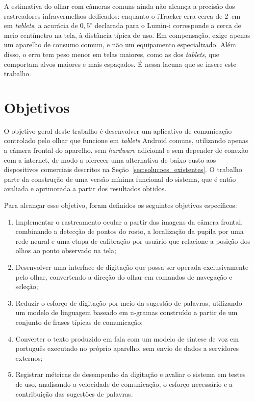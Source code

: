 A estimativa do olhar com câmeras comuns ainda não alcança a precisão dos rastreadores infravermelhos dedicados: enquanto o iTracker erra cerca de 2~cm em \textit{tablets}, a acurácia de $0{,}5^\circ$ declarada para o Lumin-i corresponde a cerca de meio centímetro na tela, à distância típica de uso. Em compensação, exige apenas um aparelho de consumo comum, e não um equipamento especializado. Além disso, o erro tem peso menor em telas maiores, como as dos \textit{tablets}, que comportam alvos maiores e mais espaçados. É nessa lacuna que se insere este trabalho.

\section{Objetivos} \label{sec:objetivos}

O objetivo geral deste trabalho é desenvolver um aplicativo de comunicação controlado pelo olhar que funcione em \textit{tablets} Android comuns, utilizando apenas a câmera frontal do aparelho, sem \textit{hardware} adicional e sem depender de conexão com a internet, de modo a oferecer uma alternativa de baixo custo aos dispositivos comerciais descritos na Seção~\ref{sec:solucoes_existentes}. O trabalho parte da construção de uma versão mínima funcional do sistema, que é então avaliada e aprimorada a partir dos resultados obtidos.

Para alcançar esse objetivo, foram definidos os seguintes objetivos específicos:

\begin{enumerate}
    \item Implementar o rastreamento ocular a partir das imagens da câmera frontal, combinando a detecção de pontos do rosto, a localização da pupila por uma rede neural e uma etapa de calibração por usuário que relacione a posição dos olhos ao ponto observado na tela;
    \item Desenvolver uma interface de digitação que possa ser operada exclusivamente pelo olhar, convertendo a direção do olhar em comandos de navegação e seleção;
    \item Reduzir o esforço de digitação por meio da sugestão de palavras, utilizando um modelo de linguagem baseado em n-gramas construído a partir de um conjunto de frases típicas de comunicação;
    \item Converter o texto produzido em fala com um modelo de síntese de voz em português executado no próprio aparelho, sem envio de dados a servidores externos;
    \item Registrar métricas de desempenho da digitação e avaliar o sistema em testes de uso, analisando a velocidade de comunicação, o esforço necessário e a contribuição das sugestões de palavras.
\end{enumerate}


